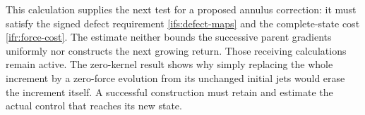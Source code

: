 This calculation supplies the next test for a proposed annulus
correction: it must satisfy the signed defect requirement
\eqref{ifs:defect-maps} and the complete-state cost
\eqref{ifr:force-cost}.  The estimate neither bounds the successive
parent gradients uniformly nor constructs the next growing return.
Those receiving calculations remain active.  The zero-kernel result
shows why simply replacing the whole increment by a zero-force
evolution from its unchanged initial jets would erase the increment
itself.  A successful construction must retain and estimate the actual
control that reaches its new state.
